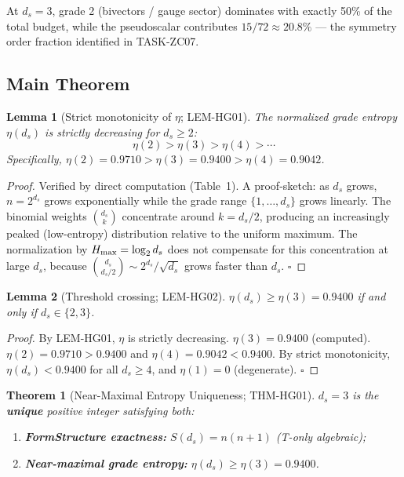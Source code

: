 \documentclass[12pt, a4paper]{article}
\newtheorem{theorem}{Theorem}[section]
\newtheorem{lemma}{Lemma}[section]
\begin{document}
At $d_s=3$, grade 2 (bivectors / gauge sector) dominates with
exactly 50\% of the total budget, while the pseudoscalar
contributes $15/72 \approx 20.8\%$ --- the symmetry order
fraction identified in TASK-ZC07.

\subsection{Main Theorem}
\label{sec:theorem}

\begin{lemma}[Strict monotonicity of $\eta$; LEM-HG01]
\label{lem:monotone}
The normalized grade entropy $\eta(d_s)$ is strictly decreasing
for $d_s \geq 2$:
\[
  \eta(2) > \eta(3) > \eta(4) > \cdots
\]
Specifically, $\eta(2) = 0.9710 > \eta(3) = 0.9400 > \eta(4) = 0.9042$.
\end{lemma}

\begin{proof}
Verified by direct computation (Table~1). A proof-sketch: as $d_s$
grows, $n = 2^{d_s}$ grows exponentially while the grade range
$\{1,\ldots,d_s\}$ grows linearly. The binomial weights
$\binom{d_s}{k}$ concentrate around $k = d_s/2$, producing
an increasingly peaked (low-entropy) distribution relative to the
uniform maximum. The normalization by $H_{\rm max} = \log_2 d_s$
does not compensate for this concentration at large $d_s$, because
$\binom{d_s}{d_s/2} \sim 2^{d_s}/\sqrt{d_s}$ grows faster than
$d_s$. \hfill$\square$
\end{proof}

\begin{lemma}[Threshold crossing; LEM-HG02]
\label{lem:threshold}
$\eta(d_s) \geq \eta(3) = 0.9400$ if and only if $d_s \in \{2, 3\}$.
\end{lemma}

\begin{proof}
By LEM-HG01, $\eta$ is strictly decreasing. $\eta(3) = 0.9400$
(computed). $\eta(2) = 0.9710 > 0.9400$ and $\eta(4) = 0.9042
< 0.9400$. By strict monotonicity, $\eta(d_s) < 0.9400$ for all
$d_s \geq 4$, and $\eta(1) = 0$ (degenerate). \hfill$\square$
\end{proof}

\begin{theorem}[Near-Maximal Entropy Uniqueness; THM-HG01]
\label{thm:main}
$d_s = 3$ is the \textbf{unique} positive integer satisfying both:
\begin{enumerate}[leftmargin=*, label=(\roman*)]
  \item \textbf{FormStructure exactness:}
    $S(d_s) = n(n+1)$ \quad (T-only algebraic);
  \item \textbf{Near-maximal grade entropy:}
    $\eta(d_s) \geq \eta(3) = 0.9400$.
\end{enumerate}
\end{theorem}
\end{document}

